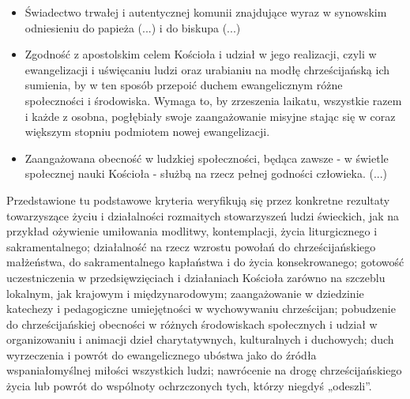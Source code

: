 \documentclass[a5paper,10pt,polish]{book}
\begin{document}
\begin{description}
\begin{itemize}
\item {} 
Świadectwo trwałej i autentycznej komunii znajdujące wyraz w synowskim odniesieniu do papieża (...)  i do biskupa (...)

\item {} 
Zgodność z apostolskim  celem Kościoła i udział w jego realizacji, czyli w ewangelizacji i uświęcaniu ludzi oraz urabianiu na modłę chrześcijańską ich sumienia, by w ten sposób przepoić duchem ewangelicznym różne społeczności i środowiska. Wymaga to, by zrzeszenia laikatu, wszystkie razem i każde z osobna, pogłębiały  swoje zaangażowanie misyjne stając się w coraz większym stopniu podmiotem nowej ewangelizacji.

\item {} 
Zaangażowana  obecność w ludzkiej społeczności,  będąca zawsze - w świetle społecznej nauki Kościoła - służbą na rzecz pełnej godności człowieka. (...)

\end{itemize}

Przedstawione tu podstawowe kryteria weryfikują się przez konkretne rezultaty towarzyszące życiu i działalności rozmaitych stowarzyszeń ludzi świeckich, jak na przykład ożywienie umiłowania modlitwy, kontemplacji,  życia liturgicznego  i sakramentalnego; działalność  na rzecz wzrostu powołań do chrześcijańskiego małżeństwa, do sakramentalnego kapłaństwa i do życia konsekrowanego;  gotowość uczestniczenia w przedsięwzięciach  i działaniach Kościoła zarówno  na szczeblu  lokalnym, jak  krajowym i międzynarodowym;  zaangażowanie w dziedzinie  katechezy i pedagogiczne umiejętności w wychowywaniu chrześcijan; pobudzenie do chrześcijańskiej  obecności w różnych środowiskach społecznych i udział w organizowaniu i animacji dzieł charytatywnych, kulturalnych i duchowych; duch wyrzeczenia i powrót do ewangelicznego ubóstwa  jako do źródła wspaniałomyślnej  miłości wszystkich ludzi; nawrócenie na drogę chrześcijańskiego życia lub powrót do wspólnoty ochrzczonych tych, którzy niegdyś „odeszli”.


\end{description}
\end{document}
